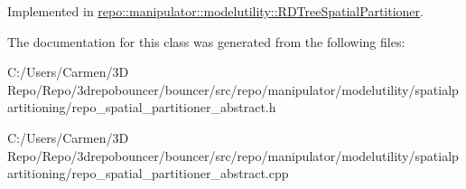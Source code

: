 Implemented in \hyperlink{classrepo_1_1manipulator_1_1modelutility_1_1_r_d_tree_spatial_partitioner_a768852ef54d357e43b86a70897002623}{repo\+::manipulator\+::modelutility\+::\+R\+D\+Tree\+Spatial\+Partitioner}.



The documentation for this class was generated from the following files\+:\begin{DoxyCompactItemize}
\item 
C\+:/\+Users/\+Carmen/3\+D Repo/\+Repo/3drepobouncer/bouncer/src/repo/manipulator/modelutility/spatialpartitioning/repo\+\_\+spatial\+\_\+partitioner\+\_\+abstract.\+h\item 
C\+:/\+Users/\+Carmen/3\+D Repo/\+Repo/3drepobouncer/bouncer/src/repo/manipulator/modelutility/spatialpartitioning/repo\+\_\+spatial\+\_\+partitioner\+\_\+abstract.\+cpp\end{DoxyCompactItemize}
